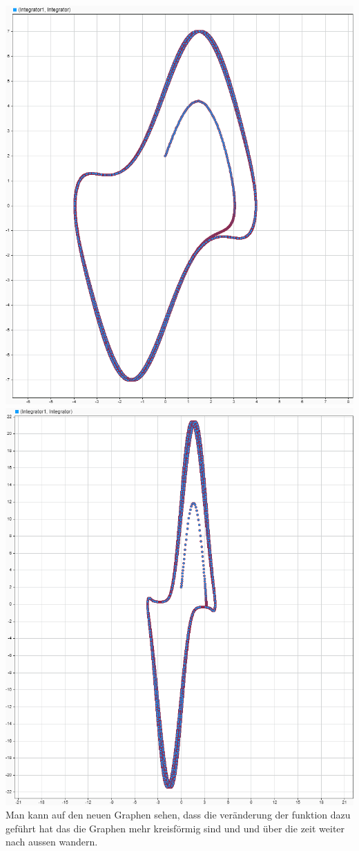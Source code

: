 \documentclass{scrartcl}
\begin{document}
\includegraphics[scale=0.3]{E4mu5v2.png}
\includegraphics[scale=0.3]{E4mu20v2.png}\\
Man kann auf den neuen Graphen sehen, dass die veränderung der funktion dazu geführt hat das die Graphen mehr kreisförmig sind und und über die zeit weiter nach aussen wandern.\\
\end{document}
